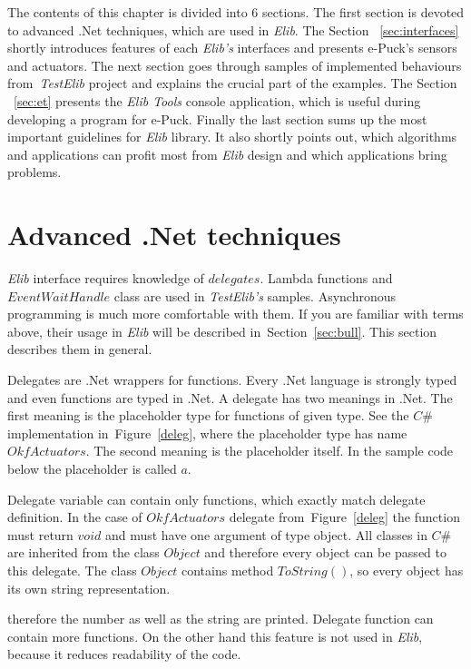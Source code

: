   The contents of this chapter is divided into 6 sections.
  The first section is devoted to advanced .Net techniques, which are used in {\it Elib}.
  The Section ~\ref{sec:interfaces} shortly introduces features of each {\it Elib's} interfaces and 
   presents e-Puck's sensors and actuators.
  The next section goes through samples of implemented behaviours 
  from~{\it TestElib} project and explains the crucial part of the examples.
  The Section ~\ref{sec:et} presents the {\it Elib Tools} console application, 
  which is useful during developing a program for e-Puck.
  Finally the last section sums up the most important guidelines for {\it Elib} library.
  It also shortly points out, which algorithms and applications can profit most
  from {\it Elib} design and which applications bring problems.
  
\section{Advanced .Net techniques} \label{sec:net}
  {\it Elib} interface requires knowledge of $delegates$. 
  Lambda functions and $EventWaitHandle$ class
  are used in {\it TestElib's} samples. 
  Asynchronous programming is much more comfortable with them.
  If you are familiar with terms above, their usage in {\it Elib} will be described 
  in~Section~\ref{sec:bull}.
  This section describes them in general.

  Delegates are .Net wrappers for functions. Every .Net language is strongly typed and even functions are typed in .Net.
  A delegate has two meanings in .Net. The first meaning is the placeholder type for functions of given type. 
  See the $C\#$ implementation in~Figure~\ref{deleg}, where the placeholder type has name $OkfActuators$.
  The second meaning is the placeholder itself. In the sample code below the placeholder is called $a$.

  Delegate variable can contain only functions, which exactly match delegate definition. In the case of $OkfActuators$ 
  delegate from~Figure~\ref{deleg} the function must return
  $void$ and must have one argument of type object. All classes in $C\#$ 
  are inherited from the class $Object$ and therefore every object can be passed to this delegate. 
  The class $Object$ contains method $ToString()$, 
  so every object has its own string representation.
  
  therefore the number as well as the string are printed.  
  Delegate function can contain more functions. On the other hand this feature is not used in {\it Elib}, 
  because it reduces readability of the code.
  

